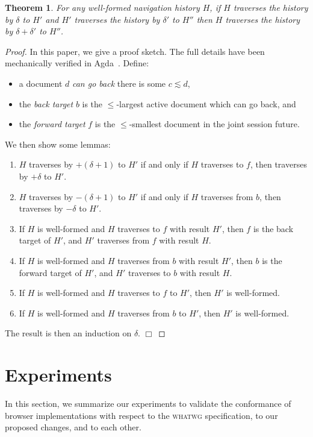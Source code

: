 \documentclass{notes}
\newcommand{\ltSess}{\lesssim}
\newtheorem{theorem}{Theorem}
\newcommand{\QED}{\hfill$\Box$}
\begin{document}
\begin{theorem}
\label{thm:fundamental}
  For any well-formed navigation history $H$,
  if $H$ traverses the history by $\delta$ to $H'$
  and $H'$ traverses the history by $\delta'$ to $H''$
  then $H$ traverses the history by $\delta+\delta'$ to $H''$.
\end{theorem}
\begin{proof}
  In this paper, we give a proof sketch. The full details have been mechanically verified in Agda~\cite{AgdaProofs}.
  Define:
  \begin{itemize}
  \item a document $d$ \emph{can go back} there is some $c \ltSess d$,
  \item the \emph{back target} $b$ is the $\le$-largest active document which can go back, and
  \item the \emph{forward target} $f$ is the $\le$-smallest document in the joint session future.
  \end{itemize}
  We then show some lemmas:
  \begin{enumerate}
  \item $H$ traverses by $+(\delta+1)$ to $H'$ if and only if
    $H$ traverses to $f$, then traverses by $+\delta$ to $H'$.
  \item $H$ traverses by $-(\delta+1)$ to $H'$ if and only if
    $H$ traverses from $b$, then traverses by $-\delta$ to $H'$.
  \item If $H$ is well-formed and $H$ traverses to $f$ with result $H'$,
    then $f$ is the back target of $H'$, and $H'$ traverses from $f$ with result $H$.
  \item If $H$ is well-formed and $H$ traverses from $b$ with result $H'$,
    then $b$ is the forward target of $H'$, and $H'$ traverses to $b$ with result $H$.
  \item If $H$ is well-formed and $H$ traverses to $f$ to $H'$, then $H'$ is well-formed.
  \item If $H$ is well-formed and $H$ traverses from $b$ to $H'$, then $H'$ is well-formed.
  \end{enumerate}
  The result is then an induction on $\delta$.
  \QED
\end{proof}

\section{Experiments}
\label{sec:experiments}

In this section, we summarize our experiments to validate the conformance of browser
implementations with respect to the \textsc{whatwg} specification, to our proposed
changes, and to each other.
\end{document}
